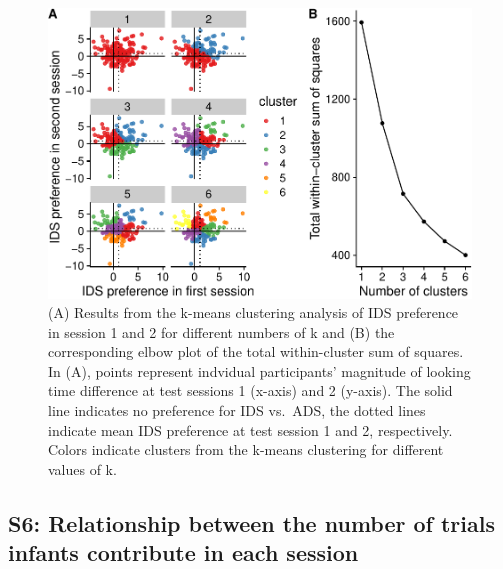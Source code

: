 \documentclass[
  man, donotrepeattitle,floatsintext]{apa6}
\begin{document}
\begin{figure}
\centering
\includegraphics{MB1T_supplement_files/figure-latex/fig3-1.pdf}
\caption{\label{fig:fig3} (A) Results from the k-means clustering analysis of IDS preference in session 1 and 2 for different numbers of k and (B) the corresponding elbow plot of the total within-cluster sum of squares. In (A), points represent indvidual participants' magnitude of looking time difference at test sessions 1 (x-axis) and 2 (y-axis). The solid line indicates no preference for IDS vs.~ADS, the dotted lines indicate mean IDS preference at test session 1 and 2, respectively. Colors indicate clusters from the k-means clustering for different values of k.}
\end{figure}

\hypertarget{s6-relationship-between-the-number-of-trials-infants-contribute-in-each-session}{%
\subsection{S6: Relationship between the number of trials infants contribute in each session}\label{s6-relationship-between-the-number-of-trials-infants-contribute-in-each-session}}
\end{document}

